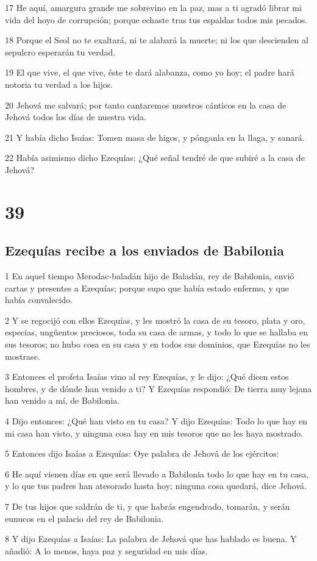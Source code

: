 \par 17 He aquí, amargura grande me sobrevino en la paz, mas a ti agradó librar mi vida del hoyo de corrupción; porque echaste tras tus espaldas todos mis pecados.
\par 18 Porque el Seol no te exaltará, ni te alabará la muerte; ni los que descienden al sepulcro esperarán tu verdad.
\par 19 El que vive, el que vive, éste te dará alabanza, como yo hoy; el padre hará notoria tu verdad a los hijos.
\par 20 Jehová me salvará; por tanto cantaremos nuestros cánticos en la casa de Jehová todos los días de nuestra vida.
\par 21 Y había dicho Isaías: Tomen masa de higos, y pónganla en la llaga, y sanará.
\par 22 Había asimismo dicho Ezequías: ¿Qué señal tendré de que subiré a la casa de Jehová?

\chapter{39}

\section*{Ezequías recibe a los enviados de Babilonia}

\par 1 En aquel tiempo Merodac-baladán hijo de Baladán, rey de Babilonia, envió cartas y presentes a Ezequías; porque supo que había estado enfermo, y que había convalecido.
\par 2 Y se regocijó con ellos Ezequías, y les mostró la casa de su tesoro, plata y oro, especias, ungüentos preciosos, toda su casa de armas, y todo lo que se hallaba en sus tesoros; no hubo cosa en su casa y en todos sus dominios, que Ezequías no les mostrase.
\par 3 Entonces el profeta Isaías vino al rey Ezequías, y le dijo: ¿Qué dicen estos hombres, y de dónde han venido a ti? Y Ezequías respondió: De tierra muy lejana han venido a mí, de Babilonia.
\par 4 Dijo entonces: ¿Qué han visto en tu casa? Y dijo Ezequías: Todo lo que hay en mi casa han visto, y ninguna cosa hay en mis tesoros que no les haya mostrado.
\par 5 Entonces dijo Isaías a Ezequías: Oye palabra de Jehová de los ejércitos:
\par 6 He aquí vienen días en que será llevado a Babilonia todo lo que hay en tu casa, y lo que tus padres han atesorado hasta hoy; ninguna cosa quedará, dice Jehová.
\par 7 De tus hijos que saldrán de ti, y que habrás engendrado, tomarán, y serán eunucos en el palacio del rey de Babilonia. 
\par 8 Y dijo Ezequías a Isaías: La palabra de Jehová que has hablado es buena. Y añadió: A lo menos, haya paz y seguridad en mis días.

